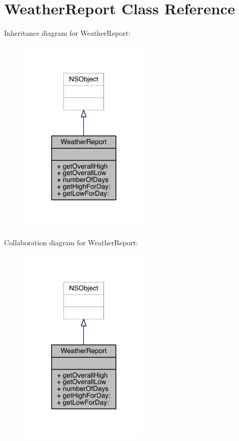 \hypertarget{interface_weather_report}{\section{Weather\-Report Class Reference}
\label{interface_weather_report}
}


Inheritance diagram for Weather\-Report\-:\nopagebreak
\begin{figure}[H]
\begin{center}
\leavevmode
\includegraphics[width=174pt]{interface_weather_report__inherit__graph}
\end{center}
\end{figure}


Collaboration diagram for Weather\-Report\-:\nopagebreak
\begin{figure}[H]
\begin{center}
\leavevmode
\includegraphics[width=174pt]{interface_weather_report__coll__graph}
\end{center}
\end{figure}
